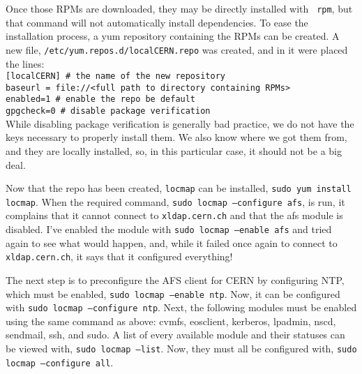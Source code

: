 \documentclass[12pt]{article}
\begin{document}
\qq Once those RPMs are downloaded, they may be directly installed with {\tt
  rpm}, but that command will not automatically install dependencies. To ease
the installation process, a yum repository containing the RPMs can be created. A
new file, {\tt /etc/yum.repos.d/localCERN.repo} was created, and in it were
placed the lines: \\
{\tt [localCERN] \# the name of the new repository} \\
{\tt baseurl = file://<full path to directory containing RPMs>} \\
{\tt enabled=1 \# enable the repo be default} \\
{\tt gpgcheck=0 \# disable package verification} \\
While disabling package verification is generally bad practice, we do not have
the keys necessary to properly install them. We also know where we got them
from, and they are locally installed, so, in this particular case, it should not
be a big deal.

\qq Now that the repo has been created, {\tt locmap} can be installed, {\tt sudo
  yum install locmap}. When the required command, {\tt sudo locmap --configure
  afs}, is run, it complains that it cannot connect to {\tt xldap.cern.ch} and
that the afs module is disabled. I've enabled the module with {\tt sudo locmap
  --enable afs} and tried again to see what would happen, and, while it failed
once again to connect to {\tt xldap.cern.ch}, it says that it configured
everything!

\qq The next step is to preconfigure the AFS client for CERN by configuring NTP,
which must be enabled, {\tt sudo locmap --enable ntp}. Now, it can be configured
with {\tt sudo locmap --configure ntp}. Next, the following modules must be
enabled using the same command as above: cvmfs, eosclient, kerberos, lpadmin,
nscd, sendmail, ssh, and sudo. A list of every available module and their
statuses can be viewed with, {\tt sudo locmap --list}. Now, they must all be
configured with, {\tt sudo locmap --configure all}. 
\end{document}
